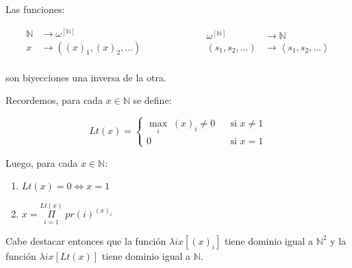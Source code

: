   \begin{lemma}
    \PN Las funciones:

    \begin{equation*}
      \begin{aligned}
        \mathbb{N} &\rightarrow \omega^{\left[\mathbb{N}\right]} \\
      	x &\rightarrow ((x)_{1}, (x)_{2}, \dotsc) \\
      \end{aligned}
      \qquad\qquad\qquad
      \begin{aligned}
        \omega^{\left[\mathbb{N}\right]} &\rightarrow \mathbb{N} \\
        (s_{1}, s_{2}, \dotsc) &\rightarrow \left\langle s_{1}, s_{2}, \dotsc \right\rangle \\
      \end{aligned}
    \end{equation*}

    \PN son biyecciones una inversa de la otra.
  \end{lemma}

  \begin{lemma}
    \PN Recordemos, para cada $x \in \mathbb{N}$ se define:

    \[
      Lt(x) = \left\{\begin{array}{lll}
                      \max_{i} \; (x)_{i} \neq 0 && \text{si } x \neq 1 \\
                      0 & & \text{si } x = 1
                      \end{array} \right.
    \]

    \PN Luego, para cada $x \in \mathbb{N}$:

    \begin{enumerate}
      \item $Lt(x) = 0 \Leftrightarrow x = 1$
      \item $x = \underset{i=1}{\overset{Lt(x)}{\Pi}} \; pr(i)^{(x)_{i}}$
    \end{enumerate}

    \PN Cabe destacar entonces que la función $\lambda ix[(x)_{i}]$ tiene dominio igual a $\mathbb{N}^{2}$ y la
    función $\lambda ix[Lt(x)]$ tiene dominio igual a $\mathbb{N}$.
  \end{lemma}
